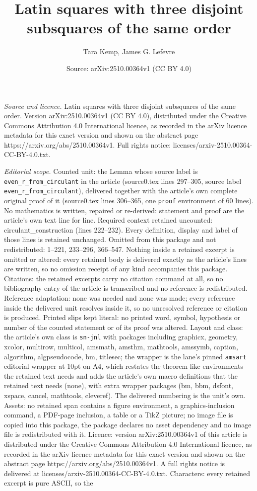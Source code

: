 \documentclass[10pt,a4paper]{amsart}
\title[Latin squares with three disjoint subsquares of the same ord]{Latin squares with three disjoint subsquares of the same order}
\author{Tara Kemp, James G. Lefevre}
\date{Source: arXiv:2510.00364v1 (CC BY 4.0)}
\begin{document}
\maketitle

\noindent\emph{Source and licence.} Latin squares with three disjoint subsquares of the same order. Version arXiv:2510.00364v1 (CC BY 4.0), distributed under the Creative Commons Attribution 4.0 International licence, as recorded in the arXiv licence metadata for this exact version and shown on the abstract page https://arxiv.org/abs/2510.00364v1. Full rights notice: licenses/arxiv-2510.00364-CC-BY-4.0.txt.\par\smallskip

\noindent\textit{Editorial scope.} Counted unit: the Lemma whose source label is \texttt{even\_r\_from\_circulant} in the article (source0.tex lines 297--305, source label \texttt{even\_r\_from\_circulant}), delivered together with the article's own complete original proof of it (source0.tex lines 306--365, one \texttt{proof} environment of 60 lines). No mathematics is written, repaired or re-derived: statement and proof are the article's own text line for line. Required context retained uncounted: circulant\_construction (lines 222--232). Every definition, display and label of those lines is retained unchanged. Omitted from this package and not redistributed: 1--221, 233--296, 366--547. Nothing inside a retained excerpt is omitted or altered: every retained body is delivered exactly as the article's lines are written, so no omission receipt of any kind accompanies this package. Citations: the retained excerpts carry no citation command at all, so no bibliography entry of the article is transcribed and no reference is redistributed. Reference adaptation: none was needed and none was made; every reference inside the delivered unit resolves inside it, so no unresolved reference or citation is produced. Printed slips kept literal: no printed word, symbol, hypothesis or number of the counted statement or of its proof was altered. Layout and class: the article's own class is \texttt{sn-jnl} with packages including graphicx, geometry, xcolor, multirow, multicol, amsmath, amsthm, mathtools, amssymb, caption, algorithm, algpseudocode, bm, titlesec; the wrapper is the lane's pinned \texttt{amsart} editorial wrapper at 10pt on A4, which restates the theorem-like environments the retained text needs and adds the article's own macro definitions that the retained text needs (none), with extra wrapper packages (bm, bbm, dsfont, xspace, cancel, mathtools, cleveref). The delivered numbering is the unit's own. Assets: no retained span contains a figure environment, a graphics-inclusion command, a PDF-page inclusion, a table or a TikZ picture; no image file is copied into this package, the package declares no asset dependency and no image file is redistributed with it. Licence: version arXiv:2510.00364v1 of this article is distributed under the Creative Commons Attribution 4.0 International licence, as recorded in the arXiv licence metadata for this exact version and shown on the abstract page https://arxiv.org/abs/2510.00364v1. A full rights notice is delivered at licenses/arxiv-2510.00364-CC-BY-4.0.txt. Characters: every retained excerpt is pure ASCII, so the 
\end{document}
